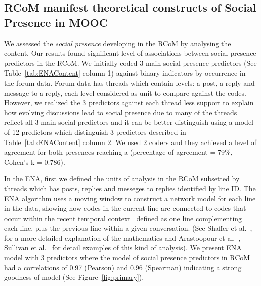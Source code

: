 \documentclass[format=acmsmall, review=false, screen=true]{acmart}
\begin{document}
\subsection{RCoM manifest theoretical constructs of Social Presence in MOOC}
We assessed the \textit{social presence} developing in the RCoM by analysing the content. Our results found significant level of associations between social presence predictors in the RCoM. We initially coded 3 main social presence predictors (See Table~\ref{tab:ENAContent} column 1) against binary indicators by occurrence in the forum data. Forum data has threads which contain levels: a post, a reply and message to a reply, each level considered as unit to compare against the codes. However, we realized the 3 predictors against each thread less support to explain how evolving discussions lead to social presence due to many of the threads reflect all 3 main social predictors and it can be better distinguish using a model of 12 predictors which distinguish 3 predictors described in Table~\ref{tab:ENAContent} column 2. We used 2 coders and they achieved a level of agreement for both presences reaching a (percentage of agreement = 79\%, Cohen's k = 0.786). 

In the ENA, first we defined the units of analysis in the RCoM subsetted by threads which has posts, replies and messeges to replies identified by line ID. The ENA algorithm uses a moving window to construct a network model for each line in the data, showing how codes in the current line are connected to codes that occur within the recent temporal context~\cite{siebert2017search} defined as one line complementing each line, plus the previous line within a given conversation. (See Shaffer et al.~\cite{shaffer2016tutorial}, for a more detailed explanation of the mathematics and Arastoopour et al.~\cite{arastoopour2015epistemic}, Sullivan et al.~\cite{sullivan2018using} for detail examples of this kind of analysis). We present ENA model with 3 predictors where the model of social presence predictors in RCoM had a correlations of 0.97 (Pearson) and 0.96 (Spearman) indicating a strong goodness of model (See Figure~\ref{fig:primary}).
\end{document}
